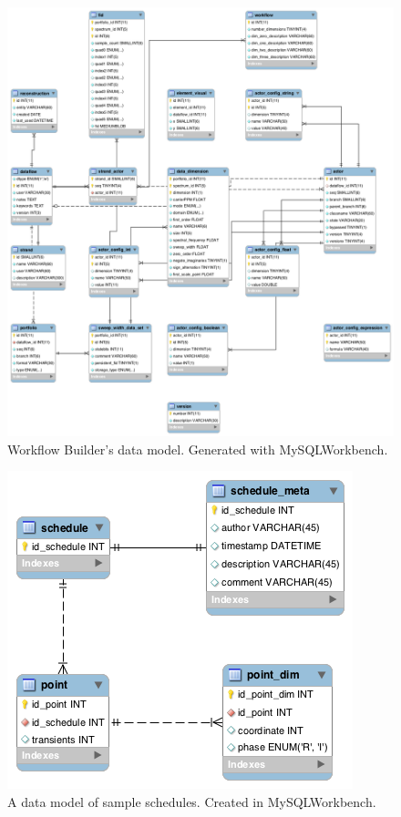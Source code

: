 \begin{figure}
  \includegraphics[scale=0.35]{figures/wb_model}
  \caption[Workflow Builder's data model]
          {Workflow Builder's data model.  Generated with MySQLWorkbench.}
  \label{wb_model}
\end{figure}

\begin{figure}
  \includegraphics[scale=0.5]{figures/schedule_model}
  \caption[A data model of sample schedules]
          {A data model of sample schedules.  Created in MySQLWorkbench.}
  \label{schedule_model}
\end{figure}

